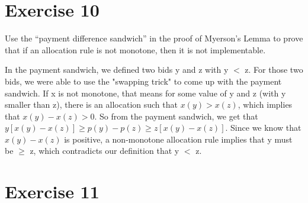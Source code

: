 \documentclass{article}
\begin{document}
\section*{Exercise 10}
Use the “payment difference sandwich” in the proof of Myerson’s Lemma to prove that if an allocation rule is not monotone, then it is not implementable.

In the payment sandwich, we defined two bids y and z with y $<$ z.  For those
two bids, we were able to use the "swapping trick" to come up with the payment
sandwich.  If x is not monotone, that means for some value of y and z (with y
smaller than z), there is an allocation such that $x(y) > x(z)$,
which implies that $x(y) - x(z) > 0$.  So from the payment sandwich, we get
that $y[x(y) - x(z)] \geq p(y) - p(z) \geq z[x(y) - x(z)]$.  Since we know
that $x(y) - x(z)$ is positive, a non-monotone allocation rule implies that y
must be $\geq$ z, which contradicts our definition that y $<$ z.
\section*{Exercise 11}
\end{document}

